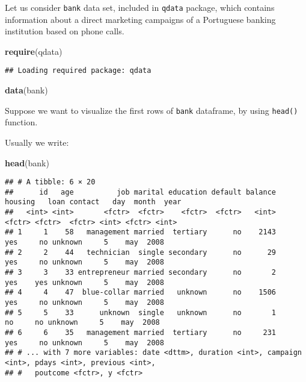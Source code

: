 \documentclass[]{book}
\newenvironment{Shaded}{\begin{snugshade}}{\end{snugshade}}
\newcommand{\KeywordTok}[1]{\textcolor[rgb]{0.13,0.29,0.53}{\textbf{{#1}}}}
\newcommand{\NormalTok}[1]{{#1}}
\begin{document}
Let us consider \texttt{bank} data set, included in \texttt{qdata}
package, which contains information about a direct marketing campaigns
of a Portuguese banking institution based on phone calls.

\begin{Shaded}
\begin{Highlighting}[]
\KeywordTok{require}\NormalTok{(qdata)}
\end{Highlighting}
\end{Shaded}

\begin{verbatim}
## Loading required package: qdata
\end{verbatim}

\begin{Shaded}
\begin{Highlighting}[]
\KeywordTok{data}\NormalTok{(bank) }
\end{Highlighting}
\end{Shaded}

Suppose we want to visualize the first rows of \texttt{bank} dataframe,
by using \texttt{head()} function.

Usually we write:

\begin{Shaded}
\begin{Highlighting}[]
\KeywordTok{head}\NormalTok{(bank)}
\end{Highlighting}
\end{Shaded}

\begin{verbatim}
## # A tibble: 6 × 20
##      id   age          job marital education default balance housing   loan contact   day  month  year
##   <int> <int>       <fctr>  <fctr>    <fctr>  <fctr>   <int>  <fctr> <fctr>  <fctr> <int> <fctr> <int>
## 1     1    58   management married  tertiary      no    2143     yes     no unknown     5    may  2008
## 2     2    44   technician  single secondary      no      29     yes     no unknown     5    may  2008
## 3     3    33 entrepreneur married secondary      no       2     yes    yes unknown     5    may  2008
## 4     4    47  blue-collar married   unknown      no    1506     yes     no unknown     5    may  2008
## 5     5    33      unknown  single   unknown      no       1      no     no unknown     5    may  2008
## 6     6    35   management married  tertiary      no     231     yes     no unknown     5    may  2008
## # ... with 7 more variables: date <dttm>, duration <int>, campaign <int>, pdays <int>, previous <int>,
## #   poutcome <fctr>, y <fctr>
\end{verbatim}
\end{document}
